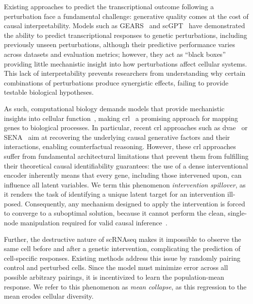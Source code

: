 \documentclass[10pt,letterpaper]{article}
\theoremstyle{definition}
\theoremstyle{remark}
\begin{document}
Existing approaches to predict the transcriptional outcome following a perturbation face a fundamental challenge: generative quality comes at the cost of causal interpretability.
Models such as GEARS~\cite{roohani2024predicting} and scGPT~\cite{cui2024scgpt} have demonstrated the ability to predict transcriptional responses to genetic perturbations, including previously unseen perturbations, although their predictive performance varies across datasets and evaluation metrics; however, they act as ``black boxes'' providing little mechanistic insight into how perturbations affect cellular systems.
This lack of interpretability prevents researchers from understanding why certain combinations of perturbations produce synergistic effects, failing to provide testable biological hypotheses.

As such, computational biology demands models that provide mechanistic insights into cellular function~\cite{chen_applying_2024}, making \gls{crl}~\cite{scholkopf2021toward} a promising approach for mapping genes to biological processes.
In particular, recent \gls{crl} approaches such as \gls{dvae}~\cite{zhang2023identifiability} or SENA~\cite{de2025interpretable} aim at recovering the underlying causal generative factors and their interactions, enabling counterfactual reasoning.
However, these \gls{crl} approaches suffer from fundamental architectural limitations that prevent them from fulfilling their theoretical causal identifiability guarantees: the use of a dense interventional encoder inherently means that every gene, including those intervened upon, can influence all latent variables.
We term this phenomenon \emph{intervention spillover}, as it renders the task of identifying a unique latent target for an intervention ill-posed.
Consequently, any mechanism designed to apply the intervention is forced to converge to a suboptimal solution, because it cannot perform the clean, single-node manipulation required for valid causal inference~\cite{brehmer2022weakly,lippe2022citris}.

Further, the destructive nature of \gls{scRNAseq} makes it impossible to observe the same cell before and after a genetic intervention, complicating the prediction of cell-specific responses.
Existing methods address this issue by randomly pairing control and perturbed cells.
Since the model must minimize error across all possible arbitrary pairings, it is incentivized to learn the population-mean response.
We refer to this phenomenon as \emph{mean collapse}, as this regression to the mean erodes cellular diversity.
\end{document}
